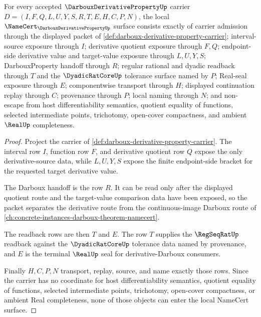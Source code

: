 \begin{theorem}
\label{thm:darboux-derivative-property-namecert-obligations}
For every accepted $\DarbouxDerivativePropertyUp$ carrier $D=(I,F,Q,L,U,Y,S,R,T,E,H,C,P,N)$, the local $\NameCert_{\DarbouxDerivativePropertyUp}$ surface consists exactly of carrier admission through the displayed packet of \autoref{def:darboux-derivative-property-carrier}; interval-source exposure through $I$; derivative quotient exposure through $F,Q$; endpoint-side derivative value and target-value exposure through $L,U,Y,S$; DarbouxProperty handoff through $R$; regular rational and dyadic readback through $T$ and the $\DyadicRatCoreUp$ tolerance surface named by $P$; Real-seal exposure through $E$; componentwise transport through $H$; displayed continuation replay through $C$; provenance through $P$; local naming through $N$; and non-escape from host differentiability semantics, quotient equality of functions, selected intermediate points, trichotomy, open-cover compactness, and ambient $\RealUp$ completeness.
\end{theorem}
\begin{proof}
Project the carrier of \autoref{def:darboux-derivative-property-carrier}. The interval row $I$, function row $F$, and derivative quotient row $Q$ expose the only derivative-source data, while $L,U,Y,S$ expose the finite endpoint-side bracket for the requested target derivative value.

The Darboux handoff is the row $R$. It can be read only after the displayed quotient route and the target-value comparison data have been exposed, so the packet separates the derivative route from the continuous-image Darboux route of \autoref{ch:concrete-instances-darboux-theorem-namecert}.

The readback rows are then $T$ and $E$. The row $T$ supplies the $\RegSeqRatUp$ readback against the $\DyadicRatCoreUp$ tolerance data named by provenance, and $E$ is the terminal $\RealUp$ seal for derivative-Darboux consumers.

Finally $H,C,P,N$ transport, replay, source, and name exactly those rows. Since the carrier has no coordinate for host differentiability semantics, quotient equality of functions, selected intermediate points, trichotomy, open-cover compactness, or ambient Real completeness, none of those objects can enter the local NameCert surface.
\end{proof}

